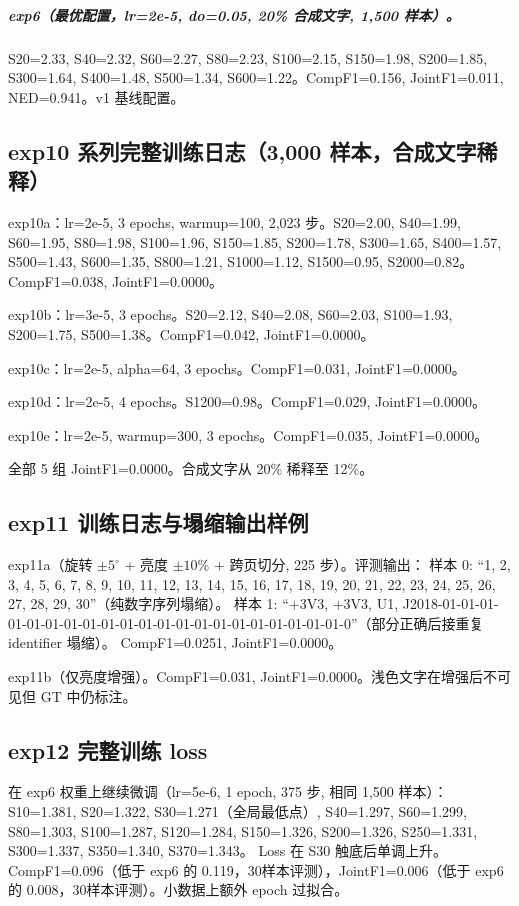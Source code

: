 \subparagraph{exp6（最优配置，lr=2e-5, do=0.05, 20\% 合成文字, 1,500 样本）。}
S20=2.33, S40=2.32, S60=2.27, S80=2.23, S100=2.15, S150=1.98, S200=1.85, S300=1.64, S400=1.48, S500=1.34, S600=1.22。CompF1=0.156, JointF1=0.011, NED=0.941。v1 基线配置。

\subsection{exp10 系列完整训练日志（3,000 样本，合成文字稀释）}

exp10a：lr=2e-5, 3 epochs, warmup=100, 2,023 步。S20=2.00, S40=1.99, S60=1.95, S80=1.98, S100=1.96, S150=1.85, S200=1.78, S300=1.65, S400=1.57, S500=1.43, S600=1.35, S800=1.21, S1000=1.12, S1500=0.95, S2000=0.82。CompF1=0.038, JointF1=0.0000。

exp10b：lr=3e-5, 3 epochs。S20=2.12, S40=2.08, S60=2.03, S100=1.93, S200=1.75, S500=1.38。CompF1=0.042, JointF1=0.0000。

exp10c：lr=2e-5, alpha=64, 3 epochs。CompF1=0.031, JointF1=0.0000。

exp10d：lr=2e-5, 4 epochs。S1200=0.98。CompF1=0.029, JointF1=0.0000。

exp10e：lr=2e-5, warmup=300, 3 epochs。CompF1=0.035, JointF1=0.0000。

全部 5 组 JointF1=0.0000。合成文字从 20\% 稀释至 12\%。

\subsection{exp11 训练日志与塌缩输出样例}

exp11a（旋转 $\pm5^\circ$ + 亮度 $\pm10\%$ + 跨页切分, 225 步）。评测输出：
样本 0: ``1, 2, 3, 4, 5, 6, 7, 8, 9, 10, 11, 12, 13, 14, 15, 16, 17, 18, 19, 20, 21, 22, 23, 24, 25, 26, 27, 28, 29, 30''（纯数字序列塌缩）。
样本 1: ``+3V3, +3V3, U1, J2018-01-01-01-01-01-01-01-01-01-01-01-01-01-01-01-01-01-01-01-01-01-0''（部分正确后接重复 identifier 塌缩）。
CompF1=0.0251, JointF1=0.0000。

exp11b（仅亮度增强）。CompF1=0.031, JointF1=0.0000。浅色文字在增强后不可见但 GT 中仍标注。

\subsection{exp12 完整训练 loss}

在 exp6 权重上继续微调（lr=5e-6, 1 epoch, 375 步, 相同 1,500 样本）：
S10=1.381, S20=1.322, S30=1.271（全局最低点）, S40=1.297, S60=1.299, S80=1.303, S100=1.287, S120=1.284, S150=1.326, S200=1.326, S250=1.331, S300=1.337, S350=1.340, S370=1.343。
Loss 在 S30 触底后单调上升。CompF1=0.096（低于 exp6 的 0.119，30样本评测），JointF1=0.006（低于 exp6 的 0.008，30样本评测）。小数据上额外 epoch 过拟合。

